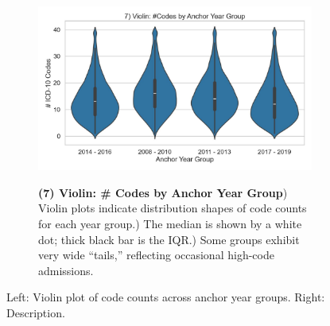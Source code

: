 \begin{figure}[ht!]
    \centering
    \begin{subfigure}{0.42\textwidth}
        \includegraphics[width=\linewidth]{mimic_plots/plot7.jpg}
    \end{subfigure}\hfill
    \begin{subfigure}{0.54\textwidth}
        \footnotesize
        \textbf{(7) Violin: \# Codes by Anchor Year Group}) Violin plots indicate distribution shapes of code counts for each year group.) The median is shown by a white dot; thick black bar is the IQR.) Some groups exhibit very wide “tails,” reflecting occasional high-code admissions.
    \end{subfigure}
    \caption{Left: Violin plot of code counts across anchor year groups. Right: Description.}
    \label{fig:plot7}
\end{figure}

